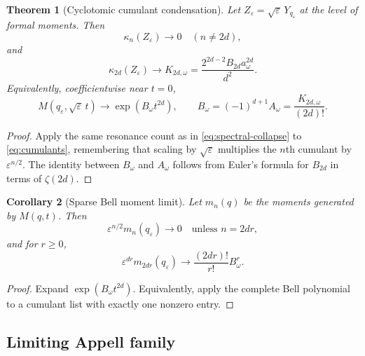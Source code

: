 \documentclass[11pt]{article}
\newtheorem{theorem}{Theorem}[section]
\newtheorem{corollary}[theorem]{Corollary}
\theoremstyle{definition}
\newcommand{\eps}{\varepsilon}
\begin{document}
\begin{theorem}[Cyclotomic cumulant condensation]
Let $Z_\eps=\sqrt\eps\,Y_{q_\eps}$ at the level of formal moments.  Then
\begin{equation}
 \kappa_n(Z_\eps)\longrightarrow0
 \quad(n\ne2d),
 \label{eq:kappa-vanish}
\end{equation}
and
\begin{equation}
 \boxed{
 \kappa_{2d}(Z_\eps)\longrightarrow
 K_{2d,\omega}
 =\frac{2^{2d-2}B_{2d}a_\omega^{2d}}{d^2}.}
 \label{eq:kappa-survive}
\end{equation}
Equivalently, coefficientwise near $t=0$,
\begin{equation}
 M(q_\eps,\sqrt\eps\,t)
 \longrightarrow \exp(B_\omega t^{2d}),
 \qquad
 B_\omega=(-1)^{d+1}A_\omega
 =\frac{K_{2d,\omega}}{(2d)!}.
 \label{eq:MGF-limit}
\end{equation}
\end{theorem}

\begin{proof}
Apply the same resonance count as in \cref{eq:spectral-collapse} to \cref{eq:cumulants}, remembering that scaling by $\sqrt\eps$ multiplies the $n$th cumulant by $\eps^{n/2}$.  The identity between $B_\omega$ and $A_\omega$ follows from Euler's formula for $B_{2d}$ in terms of $\zeta(2d)$.
\end{proof}

\begin{corollary}[Sparse Bell moment limit]
Let $m_n(q)$ be the moments generated by $M(q,t)$.  Then
\begin{equation}
 \eps^{n/2}m_n(q_\eps)\longrightarrow0
 \quad\text{unless }n=2dr,
 \label{eq:mom-zero}
\end{equation}
and for $r\ge0$,
\begin{equation}
 \boxed{
 \eps^{dr}m_{2dr}(q_\eps)
 \longrightarrow
 \frac{(2dr)!}{r!}B_\omega^r.}
 \label{eq:mom-survive}
\end{equation}
\end{corollary}

\begin{proof}
Expand $\exp(B_\omega t^{2d})$.  Equivalently, apply the complete Bell polynomial to a cumulant list with exactly one nonzero entry.
\end{proof}

\subsection{Limiting Appell family}
\end{document}
